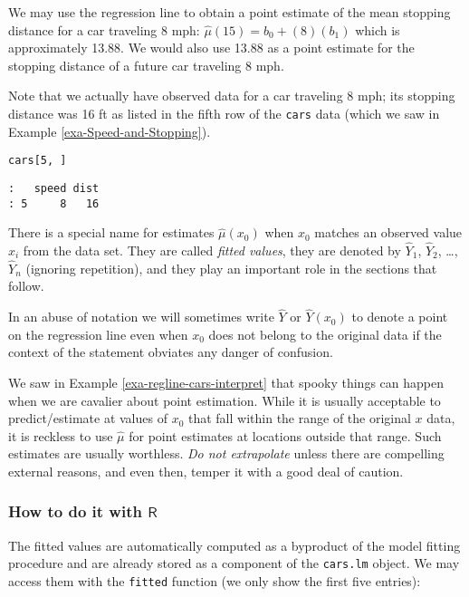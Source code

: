 \label{exa-regline-cars-pe-8mph} We may use the regression line to obtain
a point estimate of the mean stopping distance for a car traveling 8
mph: \( \hat{\mu}(15) = b_{0} + (8) (b_{1})\) which is approximately
13.88. We would also use 13.88 as a point estimate for the stopping
distance of a future car traveling 8 mph.


Note that we actually have observed data for a car traveling 8 mph;
its stopping distance was 16 ft as listed in the fifth row of the
\texttt{cars} data (which we saw in Example \ref{exa-Speed-and-Stopping}).

\begin{verbatim}
cars[5, ]
\end{verbatim}

\begin{verbatim}
:   speed dist
: 5     8   16
\end{verbatim}

There is a special name for estimates \( \hat{\mu}(x_{0}) \) when \(
x_{0} \) matches an observed value \(x_{i}\) from the data set. They
are called \emph{fitted values}, they are denoted by \(\hat{Y}_{1}\),
\(\hat{Y}_{2}\), \ldots{}, \(\hat{Y}_{n}\) (ignoring repetition), and they
play an important role in the sections that follow.

In an abuse of notation we will sometimes write \(\hat{Y}\) or
\(\hat{Y}(x_{0})\) to denote a point on the regression line even when
\(x_{0}\) does not belong to the original data if the context of the
statement obviates any danger of confusion.

We saw in Example \ref{exa-regline-cars-interpret} that spooky things can
happen when we are cavalier about point estimation. While it is
usually acceptable to predict/estimate at values of \(x_{0}\) that
fall within the range of the original \(x\) data, it is reckless to
use \(\hat{\mu}\) for point estimates at locations outside that
range. Such estimates are usually worthless. \emph{Do not extrapolate}
unless there are compelling external reasons, and even then, temper it
with a good deal of caution.

\subsubsection{How to do it with \(\mathsf{R}\)}
\label{sec-11-2-2-1}

The fitted values are automatically computed as a byproduct of the
model fitting procedure and are already stored as a component of the
\texttt{cars.lm} object. We may access them with the \texttt{fitted} function (we
only show the first five entries):

